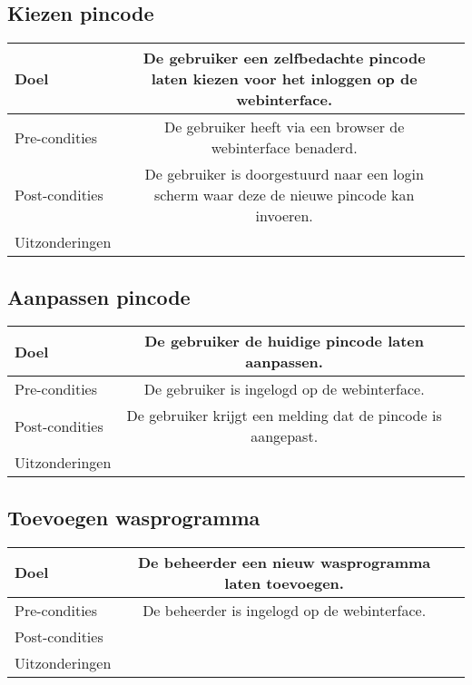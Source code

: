 \subsection{Kiezen pincode}
\begin{center}
  \begin{tabular}{ l | c | r | }
    \hline
    Doel & De gebruiker een zelfbedachte pincode laten kiezen voor het inloggen op de webinterface. \\ \hline
    Pre-condities & De gebruiker heeft via een browser de webinterface benaderd. \\ \hline
    Post-condities & De gebruiker is doorgestuurd naar een login scherm waar deze de nieuwe pincode kan invoeren. \\ \hline
    Uitzonderingen &  \\
    \hline
  \end{tabular}
\end{center}

\subsection{Aanpassen pincode}
\begin{center}
  \begin{tabular}{ l | c | r | }
    \hline
    Doel & De gebruiker de huidige pincode laten aanpassen. \\ \hline
    Pre-condities & De gebruiker is ingelogd op de webinterface. \\ \hline
    Post-condities & De gebruiker krijgt een melding dat de pincode is aangepast. \\ \hline
	Uitzonderingen &  \\
    \hline
  \end{tabular}
\end{center}

\subsection{Toevoegen wasprogramma}
\begin{center}
  \begin{tabular}{ l | c | r | }
    \hline
    Doel & De beheerder een nieuw wasprogramma laten toevoegen. \\ \hline
    Pre-condities & De beheerder is ingelogd op de webinterface. \\ \hline
    Post-condities & \\ \hline
	Uitzonderingen &  \\
    \hline
  \end{tabular}
\end{center}